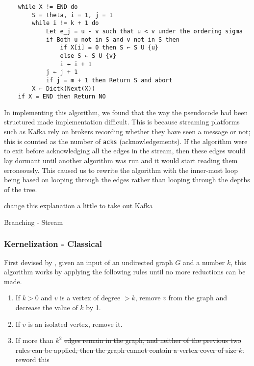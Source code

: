 \begin{verbatim}
    while X != END do
        S = theta, i = 1, j = 1
        while i != k + 1 do
            Let e_j = u - v such that u < v under the ordering sigma
            if Both u not in S and v not in S then
                if X[i] = 0 then S ← S U {u}
                else S ← S U {v}
                i ← i + 1
            j ← j + 1
            if j = m + 1 then Return S and abort
        X ← Dictk(Next(X))
    if X = END then Return NO
\end{verbatim}

In implementing this algorithm, we found that the way the pseudocode had been
structured made implementation difficult. This is because streaming platforms
such as Kafka rely on brokers recording whether they have seen a message or
not; this is counted as the number of \texttt{acks} (acknowledgements). If the
algorithm were to exit before acknowledging all the edges in the stream, then
these edges would lay dormant until another algorithm was run and it would
start reading them erroneously. This caused us to rewrite the algorithm with
the inner-most loop being based on looping through the edges rather than
looping through the depths of the tree.

change this explanation a little to take out Kafka

\begin{algorithm}[H]
    \caption{Branching - Stream}
    \DontPrintSemicolon
\end{algorithm}

\subsubsection{Kernelization - Classical}

First devised by \cite{buss1991nondeterminism}, given an input of an undirected
graph \(G\) and a number \(k\), this algorithm works by applying the following
rules until no more reductions can be made.

\begin{enumerate}
    \item
          If \(k > 0\) and \(v\) is a vertex of degree \(> k\), remove \(v\)
          from the graph and decrease the value of \(k\) by 1.
    \item
          If \(v\) is an isolated vertex, remove it.
    \item
          If more than \(k^2\) \sout{edges remain in the graph, and neither of
              the previous two rules can be applied, then the graph cannot
              contain a vertex cover of size \(k\).} reword this
\end{enumerate}

